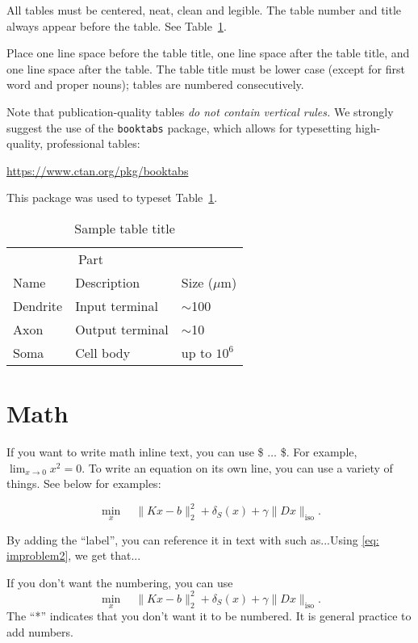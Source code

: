 \documentclass{article}
\begin{document}
All tables must be centered, neat, clean and legible.  The table number and
title always appear before the table.  See Table~\ref{sample-table}.


Place one line space before the table title, one line space after the
table title, and one line space after the table. The table title must
be lower case (except for first word and proper nouns); tables are
numbered consecutively.


Note that publication-quality tables \emph{do not contain vertical rules.} We
strongly suggest the use of the \verb+booktabs+ package, which allows for
typesetting high-quality, professional tables:
\begin{center}
  \url{https://www.ctan.org/pkg/booktabs}
\end{center}
This package was used to typeset Table~\ref{sample-table}.


\begin{table}
  \caption{Sample table title}
  \label{sample-table}
  \centering
  \begin{tabular}{lll}
    \toprule
    \multicolumn{2}{c}{Part}                   \\
    \cmidrule(r){1-2}
    Name     & Description     & Size ($\mu$m) \\
    \midrule
    Dendrite & Input terminal  & $\sim$100     \\
    Axon     & Output terminal & $\sim$10      \\
    Soma     & Cell body       & up to $10^6$  \\
    \bottomrule
  \end{tabular}
\end{table}

\section{Math}
If you want to write math inline text, you can use \$ $\hdots$ \$. For
example, $\lim_{x \to 0} x^2 = 0$. To write an equation on its own
line, you can use a variety of things. See below for examples:

\begin{equation} \label{eq: improblem2} 
\min_x \quad \| Kx-b \|^2_2 + \delta_S(x) + \gamma \|Dx \|_{\text{iso}}. 
\end{equation}

By adding the ``label'', you can reference it in text with such
as...Using \eqref{eq: improblem2}, we get that...

If you don't want the numbering, you can use
\begin{equation*} 
\min_x \quad \| Kx-b \|^2_2 + \delta_S(x) + \gamma \|Dx \|_{\text{iso}}. 
\end{equation*}
The ``*'' indicates that you don't want it to be numbered. It is
general practice to add numbers.
\end{document}
